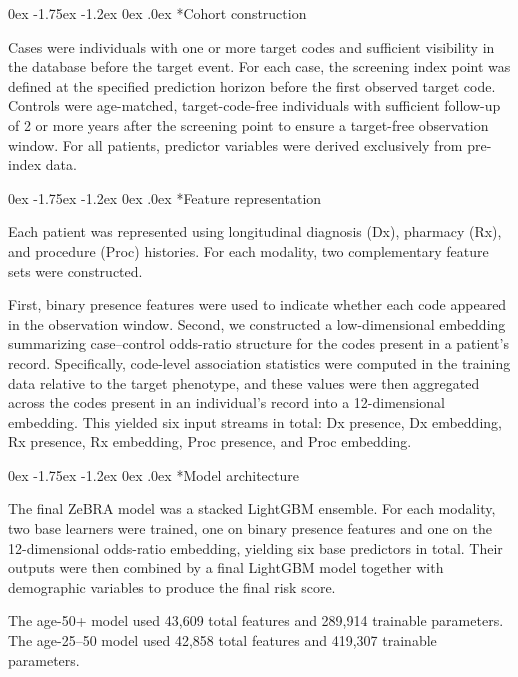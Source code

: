 \documentclass[onecolumn, compsoc,11pt]{IEEEtran}
\makeatletter
\renewcommand\subsection{\@startsection {subsection}{2}{\z@}
  {0ex \@plus -1.75ex \@minus -1.2ex}
  {0ex \@plus.0ex}
  {\fontsize{11}{11}\selectfont\bfseries\sffamily}}
\makeatother
\begin{document}
\subsection*{Cohort construction}

Cases were individuals with one or more target codes and sufficient visibility in the database before the target event.
For each case, the screening index point was defined at the specified prediction horizon before the first observed target code.
Controls were age-matched, target-code-free individuals with sufficient follow-up of 2 or more years after the screening point to ensure a target-free observation window. For all patients, predictor variables were derived exclusively from pre-index data.

\subsection*{Feature representation}

Each patient was represented using longitudinal diagnosis (Dx), pharmacy (Rx), and procedure (Proc) histories. For each modality, two complementary feature sets were constructed.

First, binary presence features were used to indicate whether each code appeared in the observation window. Second, we constructed a low-dimensional embedding summarizing case--control odds-ratio structure for the codes present in a patient's record. Specifically, code-level association statistics were computed in the training data relative to the target phenotype, and these values were then aggregated across the codes present in an individual's record into a 12-dimensional embedding. This yielded six input streams in total: Dx presence, Dx embedding, Rx presence, Rx embedding, Proc presence, and Proc embedding.

\subsection*{Model architecture}

The final ZeBRA model was a stacked LightGBM ensemble. For each modality, two base learners were trained, one on binary presence features and one on the 12-dimensional odds-ratio embedding, yielding six base predictors in total. Their outputs were then combined by a final LightGBM model together with demographic variables to produce the final risk score.

The age-50+ model used 43,609 total features and 289,914 trainable parameters. The age-25--50 model used 42,858 total features and 419,307 trainable parameters.
\end{document}
